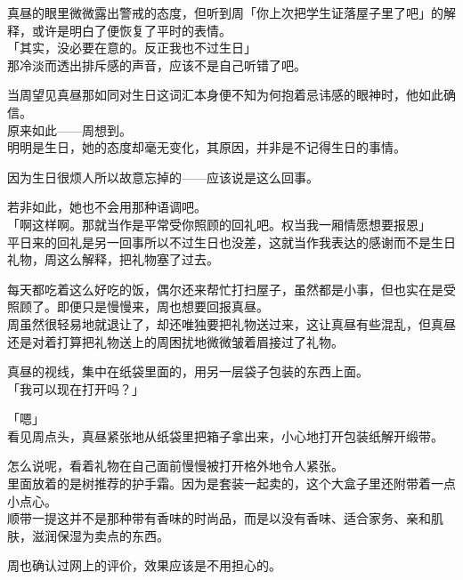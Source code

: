 真昼的眼里微微露出警戒的态度，但听到周「你上次把学生证落屋子里了吧」的解释，或许是明白了便恢复了平时的表情。\\

「其实，没必要在意的。反正我也不过生日」\\

那冷淡而透出排斥感的声音，应该不是自己听错了吧。

当周望见真昼那如同对生日这词汇本身便不知为何抱着忌讳感的眼神时，他如此确信。\\

原来如此——周想到。\\

明明是生日，她的态度却毫无变化，其原因，并非是不记得生日的事情。

因为生日很烦人所以故意忘掉的——应该说是这么回事。

若非如此，她也不会用那种语调吧。\\

「啊这样啊。那就当作是平常受你照顾的回礼吧。权当我一厢情愿想要报恩」\\

平日来的回礼是另一回事所以不过生日也没差，这就当作我表达的感谢而不是生日礼物，周这么解释，把礼物塞了过去。

每天都吃着这么好吃的饭，偶尔还来帮忙打扫屋子，虽然都是小事，但也实在是受照顾了。即便只是慢慢来，周也想要回报真昼。\\

周虽然很轻易地就退让了，却还唯独要把礼物送过来，这让真昼有些混乱，但真昼还是对着打算把礼物送上的周困扰地微微皱着眉接过了礼物。

真昼的视线，集中在纸袋里面的，用另一层袋子包装的东西上面。\\

「我可以现在打开吗？」

「嗯」\\

看见周点头，真昼紧张地从纸袋里把箱子拿出来，小心地打开包装纸解开缎带。

怎么说呢，看着礼物在自己面前慢慢被打开格外地令人紧张。\\

里面放着的是树推荐的护手霜。因为是套装一起卖的，这个大盒子里还附带着一点小点心。\\

顺带一提这并不是那种带有香味的时尚品，而是以没有香味、适合家务、亲和肌肤，滋润保湿为卖点的东西。

周也确认过网上的评价，效果应该是不用担心的。\\

